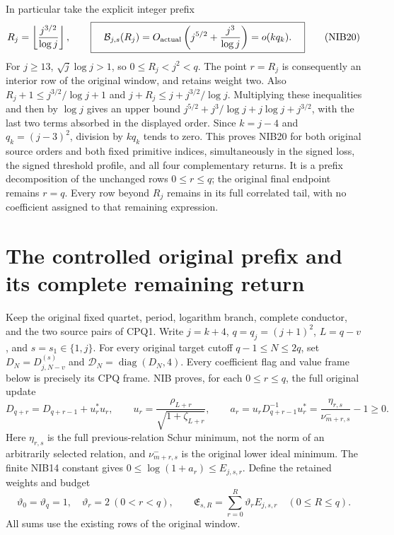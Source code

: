 \documentclass[11pt,a4paper]{article}
\begin{document}
In particular take the explicit integer prefix
\[
 R_j=\left\lfloor\frac{j^{3/2}}{\log j}\right\rfloor,
 \qquad
 \boxed{\quad
 \mathcal B_{j,s}(R_j)
   =O_{\rm actual}\left(j^{5/2}+\frac{j^3}{\log j}\right)
   =o(kq_k).
 \quad}                                                        \tag{NIB20}
\]
For $j\ge13$, $\sqrt j\log j>1$, so
$0\le R_j<j^2<q$. The point $r=R_j$ is consequently an interior
row of the original window, and retains weight two. Also
$R_j+1\le j^{3/2}/\log j+1$ and
$j+R_j\le j+j^{3/2}/\log j$. Multiplying these inequalities
and then by $\log j$ gives an upper bound
$j^{5/2}+j^3/\log j+j\log j+j^{3/2}$, with the last two terms
absorbed in the displayed order. Since $k=j-4$ and
$q_k=(j-3)^2$, division by $kq_k$ tends to zero.
This proves NIB20 for both original source orders and both
fixed primitive indices, simultaneously in the signed loss,
the signed threshold profile, and all four complementary returns.
It is a prefix decomposition of the unchanged rows $0\le r\le q$;
the original final endpoint remains $r=q$. Every row beyond
$R_j$ remains in its full correlated tail, with no coefficient
assigned to that remaining expression.
\endgroup

\label{MTBUILD:ORIGINAL_NATIVE_INTERIOR_BOUND_COMPLETE_PREREQUISITE:end}

\clearpage
\label{MTBUILD:INTERIOR_PREFIX_RETURN_COMPLETE_PREREQUISITE:start}
\begingroup
\section{The controlled original prefix and its complete remaining return}
\label{sec:IPR}

Keep the original fixed quartet, period, logarithm branch, complete
conductor, and the two source pairs of CPQ1. Write $j=k+4$,
$q=q_j=(j+1)^2$, $L=q-v$, and $s=s_1\in\{1,j\}$.
For every original target cutoff $q-1\le N\le2q$, set
$D_N=D_{j,N-v}^{(s)}$ and $\mathcal D_N=\operatorname{diag}(D_N,4)$.
Every coefficient flag and value frame below is precisely its CPQ frame.
NIB proves, for each $0\le r\le q$, the full original update
\[
 D_{q+r}=D_{q+r-1}+u_r^*u_r,\qquad
 u_r=\frac{\rho_{L+r}}{\sqrt{1+\zeta_{L+r}}},\qquad
 a_r=u_rD_{q+r-1}^{-1}u_r^*
       =\frac{\eta_{r,s}}{\nu^-_{m+r,s}}-1\ge0 .       \tag{IPR1}
\]
Here $\eta_{r,s}$ is the full previous-relation Schur minimum, not
the norm of an arbitrarily selected relation, and $\nu^-_{m+r,s}$
is the original lower ideal minimum. The finite NIB14 constant gives
$0\le\log(1+a_r)\le E_{j,s,r}$. Define the retained weights and budget
\[
 \vartheta_0=\vartheta_q=1,\quad
 \vartheta_r=2\ (0<r<q),\qquad
 \mathfrak E_{s,R}=\sum_{r=0}^R\vartheta_r E_{j,s,r}
       \quad(0\le R\le q).                              \tag{IPR2}
\]
All sums use the existing rows of the original window.
\end{document}
